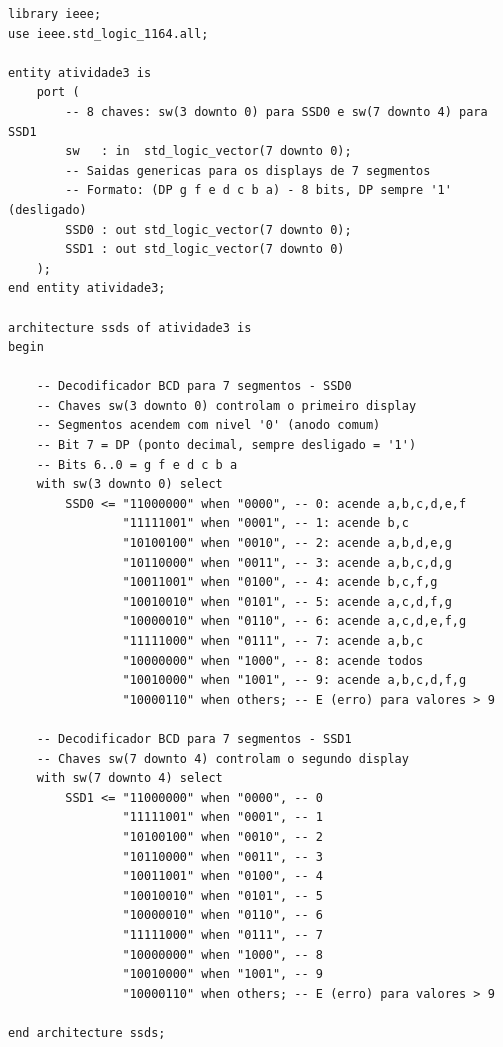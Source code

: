 \documentclass[12pt,a4paper, brazil]{article}
\begin{document}
\begin{lstlisting}[style=vhdl, caption={Arquivo atividade3.vhd -- decodificador BCD para dois displays de 7 segmentos.}]
library ieee;
use ieee.std_logic_1164.all;

entity atividade3 is
    port (
        -- 8 chaves: sw(3 downto 0) para SSD0 e sw(7 downto 4) para SSD1
        sw   : in  std_logic_vector(7 downto 0);
        -- Saidas genericas para os displays de 7 segmentos
        -- Formato: (DP g f e d c b a) - 8 bits, DP sempre '1' (desligado)
        SSD0 : out std_logic_vector(7 downto 0);
        SSD1 : out std_logic_vector(7 downto 0)
    );
end entity atividade3;

architecture ssds of atividade3 is
begin

    -- Decodificador BCD para 7 segmentos - SSD0
    -- Chaves sw(3 downto 0) controlam o primeiro display
    -- Segmentos acendem com nivel '0' (anodo comum)
    -- Bit 7 = DP (ponto decimal, sempre desligado = '1')
    -- Bits 6..0 = g f e d c b a
    with sw(3 downto 0) select
        SSD0 <= "11000000" when "0000", -- 0: acende a,b,c,d,e,f
                "11111001" when "0001", -- 1: acende b,c
                "10100100" when "0010", -- 2: acende a,b,d,e,g
                "10110000" when "0011", -- 3: acende a,b,c,d,g
                "10011001" when "0100", -- 4: acende b,c,f,g
                "10010010" when "0101", -- 5: acende a,c,d,f,g
                "10000010" when "0110", -- 6: acende a,c,d,e,f,g
                "11111000" when "0111", -- 7: acende a,b,c
                "10000000" when "1000", -- 8: acende todos
                "10010000" when "1001", -- 9: acende a,b,c,d,f,g
                "10000110" when others; -- E (erro) para valores > 9

    -- Decodificador BCD para 7 segmentos - SSD1
    -- Chaves sw(7 downto 4) controlam o segundo display
    with sw(7 downto 4) select
        SSD1 <= "11000000" when "0000", -- 0
                "11111001" when "0001", -- 1
                "10100100" when "0010", -- 2
                "10110000" when "0011", -- 3
                "10011001" when "0100", -- 4
                "10010010" when "0101", -- 5
                "10000010" when "0110", -- 6
                "11111000" when "0111", -- 7
                "10000000" when "1000", -- 8
                "10010000" when "1001", -- 9
                "10000110" when others; -- E (erro) para valores > 9

end architecture ssds;
\end{lstlisting}
\end{document}

